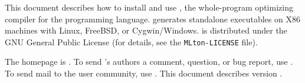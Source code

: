 This document describes how to install and use {\mlton}, the
whole-program optimizing compiler for the
programming language.
{\mlton} generates standalone executables on X86 machines with
Linux, FreeBSD, or Cygwin/Windows. 
{\mlton} is distributed under the GNU General Public License (for details, see
the {\tt MLton-LICENSE} file).

The {\mlton} homepage is \absolutelink{}.
To send {\mlton}'s authors a comment, question, or bug report, use
{\mltonmail}.
To send mail to the {\mlton} user community, use
{\mltonUserMail}.
This document describes {\mlton} version {\version}.

